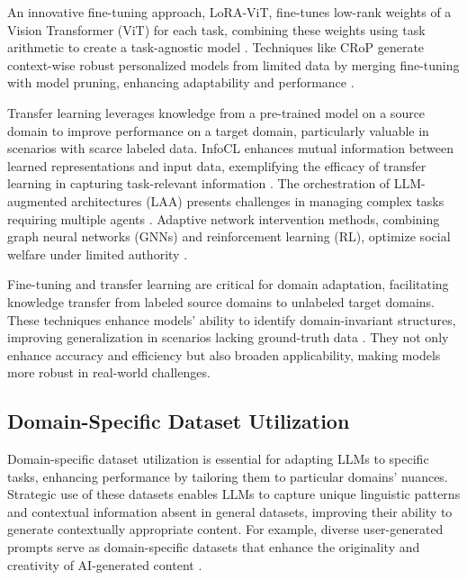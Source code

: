 An innovative fine-tuning approach, LoRA-ViT, fine-tunes low-rank weights of a Vision Transformer (ViT) for each task, combining these weights using task arithmetic to create a task-agnostic model \cite{chitale2023taskarithmeticloracontinual}. Techniques like CRoP generate context-wise robust personalized models from limited data by merging fine-tuning with model pruning, enhancing adaptability and performance \cite{kaur2024cropcontextwiserobuststatic}.

Transfer learning leverages knowledge from a pre-trained model on a source domain to improve performance on a target domain, particularly valuable in scenarios with scarce labeled data. InfoCL enhances mutual information between learned representations and input data, exemplifying the efficacy of transfer learning in capturing task-relevant information \cite{wang2022rethinkingminimalsufficientrepresentation}. The orchestration of LLM-augmented architectures (LAA) presents challenges in managing complex tasks requiring multiple agents \cite{liu2023bolaabenchmarkingorchestratingllmaugmented}. Adaptive network intervention methods, combining graph neural networks (GNNs) and reinforcement learning (RL), optimize social welfare under limited authority \cite{chen2024adaptivenetworkinterventioncomplex}.

Fine-tuning and transfer learning are critical for domain adaptation, facilitating knowledge transfer from labeled source domains to unlabeled target domains. These techniques enhance models' ability to identify domain-invariant structures, improving generalization in scenarios lacking ground-truth data \cite{ginzburg2021selfsuperviseddocumentsimilarityranking,park2023domainadaptationbasedhuman,zhao2017multiplesourcedomainadaptation}. They not only enhance accuracy and efficiency but also broaden applicability, making models more robust in real-world challenges.

\subsection{Domain-Specific Dataset Utilization} \label{subsec:Domain-Specific Dataset Utilization}

Domain-specific dataset utilization is essential for adapting LLMs to specific tasks, enhancing performance by tailoring them to particular domains' nuances. Strategic use of these datasets enables LLMs to capture unique linguistic patterns and contextual information absent in general datasets, improving their ability to generate contextually appropriate content. For example, diverse user-generated prompts serve as domain-specific datasets that enhance the originality and creativity of AI-generated content \cite{palmini2024patternscreativityuserinput}.

